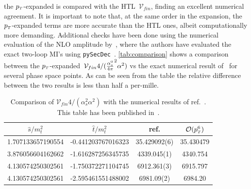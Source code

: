 the $p_{\scriptscriptstyle T}$-expanded is compared with the HTL~$\mathcal{V}_{fin}$, finding an excellent numerical agreement.
It is important to note that, at the same order in the expansion, 
the $p_{\scriptscriptstyle T}$-expanded terms are more accurate than
the HTL ones, albeit computationally more demanding.  Additional checks have been done using the numerical evaluation of the NLO amplitude by~\cite{Chen:2020gae}, where the authors have evaluated the exact two-loop MI's using \texttt{pySecDec}~\cite{Borowka:2017idc, Borowka:2018goh}. \autoref{tab:comparison} shows a comparison between the $p_{\scriptscriptstyle T}$-expanded~$\mathcal{V}_{fin} 4/(\frac{\alpha_s^0}{4 \pi}^2 \alpha^2)$ vs the exact numerical result of~\cite{Chen:2020gae} for several phase space points. 
As can be seen from the table the relative difference 
between the two results is less than half a per-mille.
\begin{table}
	\renewcommand{\arraystretch}{1.2}
	\centering
	\begin{tabular}{| c| c | c | c| } \hline
		\rowcolor{lightgray}  $\hat{s}/m_t^2$ & $\hat{t}/m_t^2$ &  ref.\cite{Chen:2020gae} & $\mathcal{O}(p_{\scriptscriptstyle T}^6)$  \\ \hline 
		\cellcolor{lightgray} 1.707133657190554 & \cellcolor{lightgray} -0.441203767016323 & 35.429092(6) & 35.430479 \\
		\cellcolor{lightgray} 3.876056604162662 & \cellcolor{lightgray} -1.616287256345735 & 4339.045(1) & 4340.754 \\
		\cellcolor{lightgray} 4.130574250302561 & \cellcolor{lightgray} -1.750372271104745 & 6912.361(3) & 6915.797 \\
		\cellcolor{lightgray} 4.130574250302561 & \cellcolor{lightgray} -2.595461551488002 & 6981.09(2) & 6984.20  \\ \hline
	\end{tabular}
	\caption{Comparison of $\mathcal{V}_{fin} 4/(\alpha_s^2 \alpha^2)$ with the numerical results of ref.~\cite{Chen:2020gae}. This table has been published in~\cite{Alasfar:2021ppe}. \label{tab:comparison}}
\end{table}
